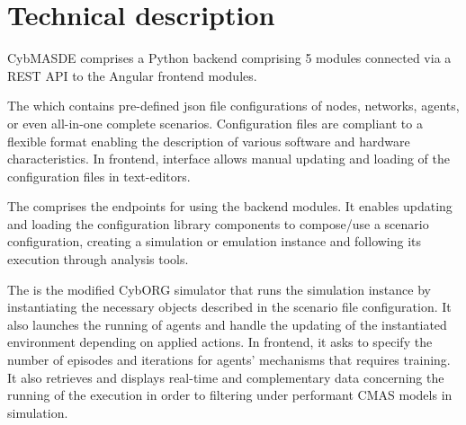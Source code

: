 \documentclass[sigconf]{aamas}
\begin{document}


\section{Technical description}

CybMASDE comprises a Python backend comprising 5 modules connected via a REST API to the Angular frontend modules.

The  which contains pre-defined json file configurations of nodes, networks, agents, or even all-in-one complete scenarios. Configuration files are compliant to a flexible format enabling the description of various software and hardware characteristics. In frontend, interface allows manual updating and loading of the configuration files in text-editors.

The  comprises the endpoints for using the backend modules. It enables updating and loading the configuration library components to compose/use a scenario configuration, creating a simulation or emulation instance and following its execution through analysis tools.

The  is the modified CybORG simulator that runs the simulation instance by instantiating the necessary objects described in the scenario file configuration. It also launches the running of agents and handle the updating of the instantiated environment depending on applied actions. In frontend, it asks to specify the number of episodes and iterations for agents' mechanisms that requires training. It also retrieves and displays real-time and complementary data concerning the running of the execution in order to filtering under performant CMAS models in simulation.
\end{document}
